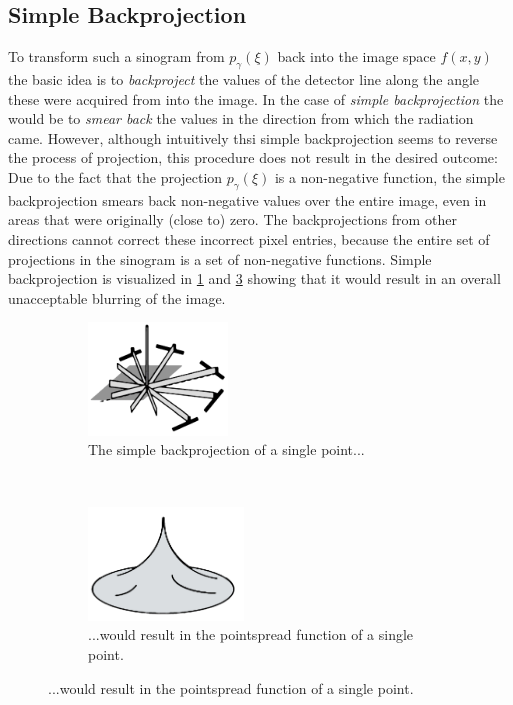 \subsection{Simple Backprojection}
\par To transform such a sinogram from \(p_\gamma(\xi)\) back into the image space \(f(x,y)\) the basic idea is to \emph{backproject} the values of the detector line along the angle these were acquired from into the image. In the case of \emph{simple backprojection} the would be to \emph{smear back} the values in the direction from which the radiation came. However, although intuitively thsi simple backprojection seems to reverse the process of projection, this procedure does not result in the desired outcome: Due to the fact that the projection \(p_\gamma(\xi)\) is a non-negative
function, the simple backprojection smears back non-negative values over the entire image, even in areas that were originally (close to) zero. The backprojections from other directions cannot correct these incorrect pixel entries, because the entire set of projections in the sinogram is a set of non-negative functions. Simple backprojection is visualized in \ref{zeng1} and \ref{zeng2} showing that it would result in an overall unacceptable blurring of the image.\cite{buzug}
\begin{figure}[h!]
	\centering
	\begin{subfigure}[b]{0.5\textwidth}
		\centering
		\includegraphics[height=3cm]{images/zeng1_Shopped.png}
		\caption{The simple backprojection of a single point...\cite{zeng}}
		\label{zeng1}
	\end{subfigure}%
	~
	\begin{subfigure}[b]{0.5\textwidth}
		\centering
		\includegraphics[height=3cm]{images/zeng2_Shopped.png}
		\caption{...would result in the pointspread function of a single point.\cite{zeng}}
		\label{zeng2}
	\end{subfigure}%
\end{figure}
